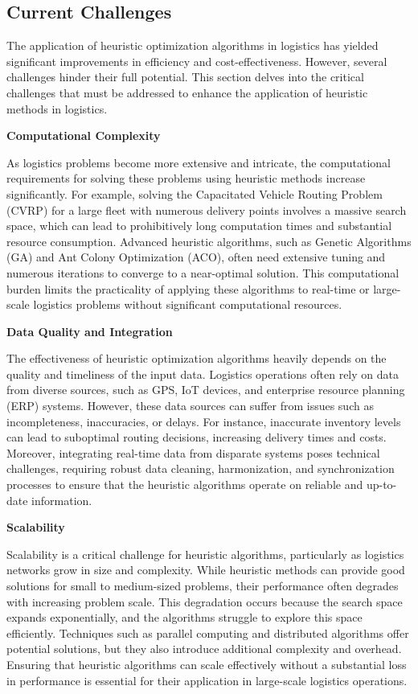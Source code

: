 \documentclass[
]{article}
\begin{document}
    \subsection{Current Challenges}\label{subsec:current-challenges}

    The application of heuristic optimization algorithms in logistics has yielded significant improvements in efficiency and cost-effectiveness. However, several challenges hinder their full potential. This section delves into the critical challenges that must be addressed to enhance the application of heuristic methods in logistics.

    \textbf{Computational Complexity}

    As logistics problems become more extensive and intricate, the computational requirements for solving these problems using heuristic methods increase significantly. For example, solving the Capacitated Vehicle Routing Problem (CVRP) for a large fleet with numerous delivery points involves a massive search space, which can lead to prohibitively long computation times and substantial resource consumption. Advanced heuristic algorithms, such as Genetic Algorithms (GA) and Ant Colony Optimization (ACO), often need extensive tuning and numerous iterations to converge to a near-optimal solution. This computational burden limits the practicality of applying these algorithms to real-time or large-scale logistics problems without significant computational resources.

    \textbf{Data Quality and Integration}

    The effectiveness of heuristic optimization algorithms heavily depends on the quality and timeliness of the input data. Logistics operations often rely on data from diverse sources, such as GPS, IoT devices, and enterprise resource planning (ERP) systems. However, these data sources can suffer from issues such as incompleteness, inaccuracies, or delays. For instance, inaccurate inventory levels can lead to suboptimal routing decisions, increasing delivery times and costs. Moreover, integrating real-time data from disparate systems poses technical challenges, requiring robust data cleaning, harmonization, and synchronization processes to ensure that the heuristic algorithms operate on reliable and up-to-date information.

    \textbf{Scalability}

    Scalability is a critical challenge for heuristic algorithms, particularly as logistics networks grow in size and complexity. While heuristic methods can provide good solutions for small to medium-sized problems, their performance often degrades with increasing problem scale. This degradation occurs because the search space expands exponentially, and the algorithms struggle to explore this space efficiently. Techniques such as parallel computing and distributed algorithms offer potential solutions, but they also introduce additional complexity and overhead. Ensuring that heuristic algorithms can scale effectively without a substantial loss in performance is essential for their application in large-scale logistics operations.
\end{document}
